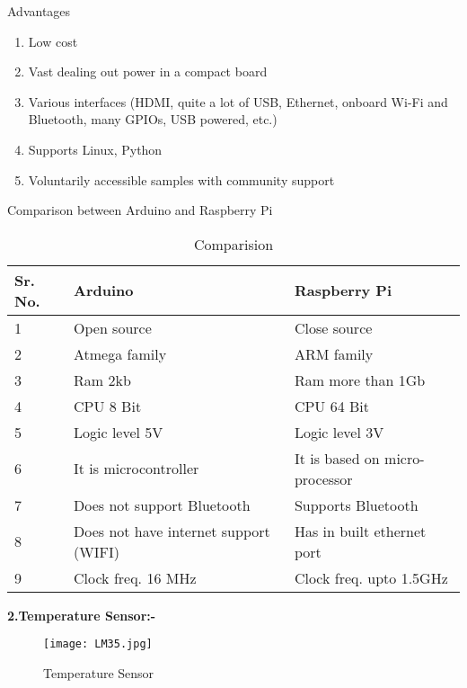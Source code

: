 \documentclass[12pt,a4paper]{report}
\begin{document}
\noindent Advantages

\begin{enumerate}
\item  Low cost 

\item  Vast dealing out power in a compact board

\item  Various interfaces (HDMI, quite a lot of USB, Ethernet, onboard Wi-Fi and Bluetooth, many GPIOs, USB powered, etc.)

\item  Supports Linux, Python

\item  Voluntarily accessible samples with community support
\end{enumerate}

\noindent Comparison between Arduino and Raspberry Pi 

\begin{table}[ht]
\centering
    \resizebox{\textwidth}{!}
    {
\begin{tabular}{|p{0.7in}|p{1.8in}|p{2.0in}|} \hline 
Sr. No.  & Arduino & Raspberry Pi  \\ \hline 
1 & Open source  & Close source  \\ \hline 
2 & Atmega family  & ARM family  \\ \hline 
3 & Ram 2kb & Ram more than 1Gb  \\ \hline 
4 & CPU 8 Bit & CPU 64 Bit  \\ \hline 
5 & Logic level 5V & Logic level 3V \\ \hline 
6 & It is microcontroller  & It is based on micro-processor  \\ \hline 
7 & Does not support Bluetooth  & Supports Bluetooth  \\ \hline 
8 & Does not have internet support (WIFI) & Has in built ethernet port  \\ \hline 
9 & Clock freq. 16 MHz  & Clock freq. upto 1.5GHz \\ \hline 

\end{tabular}
}
    \caption{Comparision}
    \label{tab:my_label}
\end{table}

\newline
\newline
\noindent \textbf{2.Temperature Sensor:-}

\begin{figure}[htp]
    \texttt{[image: LM35.jpg]}
    \caption{Temperature Sensor }
\end{figure}
\end{document}
